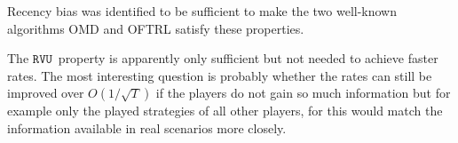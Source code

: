 \documentclass[a4paper]{article}
\theoremstyle{definition}
\newcommand{\myprop}{\ensuremath{\texttt{RVU}}}
\begin{document}
Recency bias was identified to be sufficient to make the two
well-known algorithms OMD and OFTRL satisfy these properties.

The \myprop~property is apparently only sufficient but not needed to
achieve faster rates.
The most interesting question is probably whether the rates can still
be improved over $O(1/\sqrt{T})$ if the players do not gain so much
information
but for example only the played strategies of all other players, for
this would match the information available in real scenarios more closely.


\clearpage
{}


\printbibliography
\end{document}
